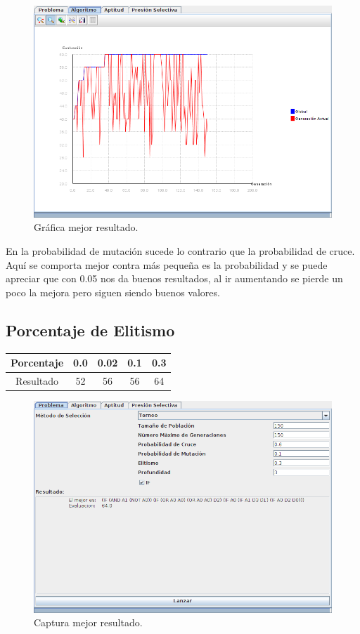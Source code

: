 \documentclass[12pt]{article}
\begin{document}
\begin{figure}[H]
\centering
\includegraphics[scale=0.4]{graficas/pmg60}
\caption{Gráfica mejor resultado.}
\end{figure}

En la probabilidad de mutación sucede lo contrario que la probabilidad de cruce. Aquí se comporta mejor contra más pequeña es la probabilidad y se puede apreciar que con 0.05 nos da buenos resultados, al ir aumentando se pierde un poco la mejora pero siguen siendo buenos valores.	

	

\subsection{Porcentaje de Elitismo}
\begin{table}[H]
\begin{center}
\begin{tabular}{|ccccc|} \hline
Porcentaje   & 0.0 & 0.02 & 0.1 & 0.3 \\  \hline
Resultado  &  52 & 56 & 56 & 64\\ \hline
\end{tabular}
\end{center}
\end{table}

\begin{figure}[H]
\centering
\includegraphics[scale=0.4]{graficas/e64}
\caption{Captura mejor resultado.}
\end{figure}
\end{document}
